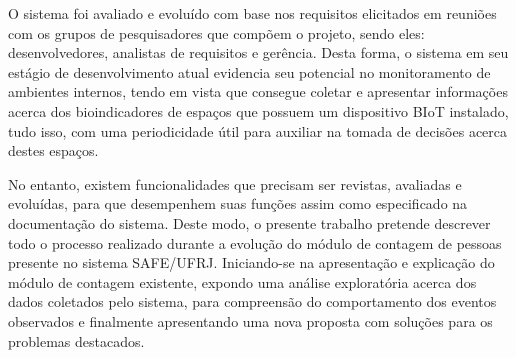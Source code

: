 O sistema foi avaliado e evoluído com base nos requisitos elicitados em reuniões com os grupos de pesquisadores que compõem o projeto, sendo eles: desenvolvedores, analistas de requisitos e gerência. Desta forma, o sistema em seu estágio de desenvolvimento atual evidencia seu potencial no monitoramento de ambientes internos, tendo em vista que consegue coletar e apresentar informações acerca dos bioindicadores de espaços que possuem um dispositivo BIoT instalado, tudo isso, com uma periodicidade útil para auxiliar na tomada de decisões acerca destes espaços.

No entanto, existem funcionalidades que precisam ser revistas, avaliadas e evoluídas, para que desempenhem suas funções assim como especificado na documentação do sistema. Deste modo, o presente trabalho pretende descrever todo o processo realizado durante a evolução do módulo de contagem de pessoas presente no sistema SAFE/UFRJ. Iniciando-se na apresentação e explicação do módulo de contagem existente, expondo uma análise exploratória acerca dos dados coletados pelo sistema, para compreensão do comportamento dos eventos observados e finalmente apresentando uma nova proposta com soluções para os problemas destacados.

